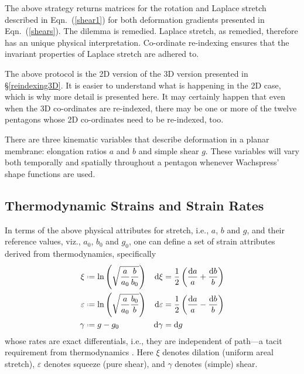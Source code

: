 The above strategy returns matrices for the rotation and Laplace stretch described in Eqn.~(\ref{shear1}) for both deformation gradients presented in Eqn.~(\ref{shears}). The dilemma is remedied.  Laplace stretch, as remedied, therefore has an unique physical interpretation.    Co-ordinate re-indexing ensures that the invariant properties of Laplace stretch \cite{McLellan80} are adhered to.

The above protocol is the 2D version of the 3D version \cite{Pauletal20} presented in \S\ref{reindexing3D}.  It is easier to understand what is happening in the 2D case, which is why more detail is presented here.  It may certainly happen that even when the 3D co-ordinates are re-indexed, there may be one or more of the twelve pentagons whose 2D co-ordinates need to be re-indexed, too.

There are three kinematic variables that describe deformation in a planar membrane: elongation ratios $a$ and $b$ and simple shear $g$.  These variables will vary both temporally and spatially throughout a pentagon whenever Wachspress' shape functions are used.

\subsection{Thermodynamic Strains and Strain Rates}
\label{strainsAndStrainRates2D}

In terms of the above physical attributes for stretch, i.e., $a$, $b$ and $g$, and their reference values, viz., $a_0$, $b_0$ and $g_0$, one can define a set of strain attributes derived from thermo\-dynamics, specifically \cite{Freed17}
\begin{subequations}
    \label{thermodynamicStrains2D}
    \begin{align}
    \xi & \defeq \ln \left( \sqrt{\frac{a}{a_0} \frac{b}{b_0}} \right) & 
    \mathrm{d} \xi & = \frac{1}{2} \left( \frac{\mathrm{d}a}{a} + 
    \frac{\mathrm{d}b}{b} \right) \\
    \varepsilon & \defeq \ln \left( \sqrt{\frac{a}{a_0} \frac{b_0}{b}} \right) &
    \mathrm{d} \varepsilon & = \frac{1}{2} \left( \frac{\mathrm{d}a}{a} - 
    \frac{\mathrm{d}b}{b} \right) \\
    \gamma & \defeq g - g_0 & 
    \mathrm{d} \gamma & = \mathrm{d} g
    \end{align}
\end{subequations}
whose rates are exact differentials, i.e., they are independent of path---a tacit requirement from thermo\-dynamics \cite{Caratheodory09}.  Here $\xi$ denotes dilation (uniform areal stretch), $\varepsilon$ denotes squeeze (pure shear), and $\gamma$ denotes (simple) shear. 

